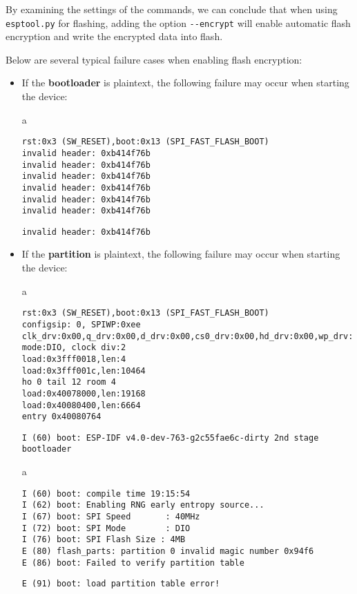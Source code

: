 \documentclass[a4paper,12pt]{book}
\begin{document}
By examining the settings of the commands, we can conclude that when using \verb|esptool.py| for flashing, adding the option \verb|--encrypt| will enable automatic flash encryption and write the encrypted data into flash.

Below are several typical failure cases when enabling flash encryption:

\begin{itemize}[leftmargin=1em]
    \item If the \textbf{bootloader} is plaintext, the following failure may occur when starting the device:

\begin{codebloc}
\begin{tabular}{a}
\begin{verbatim}
rst:0x3 (SW_RESET),boot:0x13 (SPI_FAST_FLASH_BOOT)
invalid header: 0xb414f76b
invalid header: 0xb414f76b
invalid header: 0xb414f76b
invalid header: 0xb414f76b
invalid header: 0xb414f76b
invalid header: 0xb414f76b
\end{verbatim}
\vspace{-6pt}
\verb|invalid header: 0xb414f76b|
\end{tabular}
\end{codebloc}

    \item If the \textbf{partition} is plaintext, the following failure may occur when starting the device:

\begin{codebloc}
\begin{tabular}{a}
\begin{verbatim}
rst:0x3 (SW_RESET),boot:0x13 (SPI_FAST_FLASH_BOOT)
configsip: 0, SPIWP:0xee
clk_drv:0x00,q_drv:0x00,d_drv:0x00,cs0_drv:0x00,hd_drv:0x00,wp_drv:0x00
mode:DIO, clock div:2
load:0x3fff0018,len:4
load:0x3fff001c,len:10464
ho 0 tail 12 room 4
load:0x40078000,len:19168
load:0x40080400,len:6664
entry 0x40080764
\end{verbatim}
\vspace{-6pt}
\verb|I (60) boot: ESP-IDF v4.0-dev-763-g2c55fae6c-dirty 2nd stage bootloader|
\end{tabular}
\end{codebloc}

\begin{codebloc}
\begin{tabular}{a}
\begin{verbatim}
I (60) boot: compile time 19:15:54
I (62) boot: Enabling RNG early entropy source...
I (67) boot: SPI Speed       : 40MHz
I (72) boot: SPI Mode        : DIO
I (76) boot: SPI Flash Size : 4MB
E (80) flash_parts: partition 0 invalid magic number 0x94f6
E (86) boot: Failed to verify partition table
\end{verbatim}
\vspace{-6pt}
\verb|E (91) boot: load partition table error!|
\end{tabular}
\end{codebloc}


\end{itemize}
\end{document}
